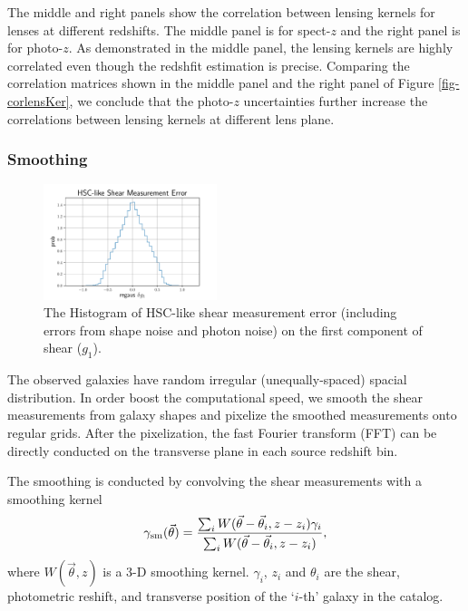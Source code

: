 \documentclass[twocolumn]{aastex62}
\begin{document}
The middle and right panels show the correlation between lensing kernels for lenses at different redshifts. The middle panel is for
spect-$z$ and the right panel is for photo-$z$.
As demonstrated in the middle panel, the lensing kernels are highly correlated even though the redshfit estimation is precise.
Comparing the correlation matrices shown in the middle panel and the right panel of Figure \ref{fig-corlensKer}, we conclude
that the photo-$z$ uncertainties further increase the correlations between lensing kernels at different lens plane.

\subsubsection{Smoothing}
\label{subsec:method-smoothing}

\begin{figure}[!t]
 \centering
 \includegraphics[width=0.45\textwidth]{shapeMeasurementError-HSCY1.pdf}
 \caption{The Histogram of HSC-like shear measurement error (including errors from shape noise and photon noise) on the
        first component of shear ($g_1$).}
 \label{fig:mass-redshift}
\end{figure}

The observed galaxies have random irregular (unequally-spaced) spacial distribution. In order boost the computational
speed, we smooth the shear measurements from galaxy shapes and pixelize the smoothed measurements onto regular grids.
After the pixelization, the fast Fourier transform (FFT) can be directly conducted on the transverse plane in each
source redshift bin.

The smoothing is conducted by convolving the shear measurements with a smoothing kernel
\begin{equation}
\gamma_{\rm{sm}} (\vec{\theta})  = \frac{\sum_i  W(\vec{\theta}-\vec{{\theta}}_i,z-z_i) \gamma_i}{\sum_i W(\vec{\theta}-\vec{{\theta}}_i,z-z_i) },
\end{equation}
where $W(\vec{\theta},z)$ is a $3$-D smoothing kernel. $\gamma_i$, $z_i$ and $\theta_i$ are the shear,
photometric reshift, and transverse position of the `$i$-th' galaxy in the catalog.
\end{document}
